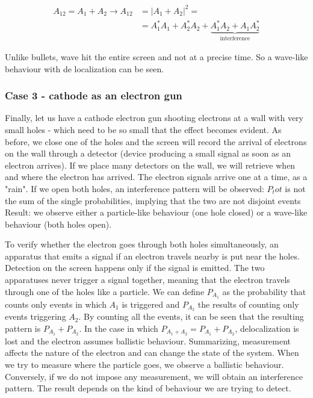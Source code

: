     \begin{align*}
      A_{12} = A_1+A_2\rightarrow A_{12} &= |A_1+A_2|^2=\\
                                         &=A_1^*A_1 + A_2^*A_2 + \underbrace{A_1^*A_2 + A_1A_2^*}_{\text{interference}}
    \end{align*}

    Unlike bullets, wave hit the entire screen and not at a precise time.
    So a wave-like behaviour with de localization can be seen.

    \subsubsection{Case 3 - cathode as an electron gun}
    Finally, let us have a cathode electron gun shooting electrons at a wall with very small holes - which need to be so small that the effect becomes evident. As before, we close one of the holes and the screen will record the arrival of electrons on the wall through a detector (device producing a small signal as soon as an electron arrives). If we place many detectors on the wall, we will retrieve when and where the electron has arrived. The electron signals arrive one at a time, as a "rain". If we open both holes, an interference pattern will be observed: $P_tot$ is not the sum of the single probabilities, implying that the two are not disjoint events 
Result: we observe either a particle-like behaviour (one hole closed) or a wave-like behaviour (both holes open).
    
   
    
    To verify whether the electron goes through both holes simultaneously, an apparatus that emits a signal if an electron travels nearby is put near the holes.
    Detection on the screen happens only if the signal is emitted.
    The two apparatuses never trigger a signal together, meaning that the electron travels through one of the holes like a particle.
    We can define $P_{A_1}$ as the probability that counts only events in which $A_1$ is triggered and $P_{A_2}$ the results of counting only events triggering $A_2$.
    By counting all the events, it can be seen that the resulting pattern is $P_{A_1}+P_{A_2}$.
    In the case in which $P_{A_1+A_2} = P_{A_1} + P_{A_2}$, delocalization is lost and the electron assumes ballistic behaviour.
    Summarizing, measurement affects the nature of the electron and can change the state of the system.
When we try to measure where the particle goes, we observe a ballistic behaviour. Conversely, if we do not impose any measurement, we will obtain an interference pattern. The result depends on the kind of behaviour we are trying to detect. 

